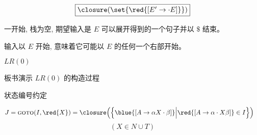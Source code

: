 \begin{frame}{}
  \[
    \fbox{$\closure(\set{\red{[E' \to \cdot E]}})$}
  \]

  \vspace{0.50cm}
  \begin{center}
    一开始, 栈为空, 期望输入是 $E$ 可以展开得到的一个句子并以 $\$$ 结束。

    \vspace{1.0cm}
    输入以 $E$ 开始, 意味着它可能以 $E$ 的任何一个右部开始。
  \end{center}
\end{frame}

\begin{frame}{}
  \begin{center}
    $LR(0)$ 

    \vspace{0.30cm}

    \vspace{0.30cm}
  \end{center}
\end{frame}

\begin{frame}{}
  \begin{center}
    板书演示 $LR(0)$ 的构造过程

    \vspace{0.20cm}
    状态编号约定
  \end{center}
\end{frame}

\begin{frame}{}
\end{frame}

\begin{frame}{}
  \begin{center}
    \begin{align*}
      J = \textsc{goto}(I, \red{X}) &= \closure\Big(\Big\{
            \blue{[A \to \alpha X \cdot \beta]}
          \Big\lvert \red{[A \to \alpha \cdot X \beta]} \in I \Big\}\Big)
    \end{align*}
    \[
      (X \in N \cup T)
    \]
  \end{center}
\end{frame}


